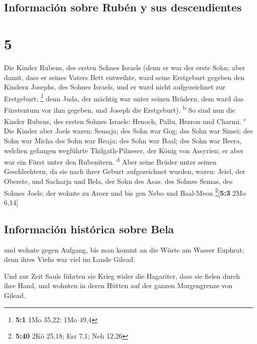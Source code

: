 \hypertarget{informaciuxf3n-sobre-rubuxe9n-y-sus-descendientes}{%
\subsection{Información sobre Rubén y sus
descendientes}\label{informaciuxf3n-sobre-rubuxe9n-y-sus-descendientes}}

\hypertarget{section-4}{%
\section{5}\label{section-4}}

 Die Kinder Rubens, des ersten Sohnes Israels (denn er war
der erste Sohn; aber damit, dass er seines Vaters Bett entweihte, ward
seine Erstgeburt gegeben den Kindern Josephs, des Sohnes Israels, und er
ward nicht aufgezeichnet zur Erstgeburt; \footnote{\textbf{5:1} 1Mo
  35,22; 1Mo 49,4}  denn Juda, der mächtig war unter
seinen Brüdern, dem ward das Fürstentum vor ihm gegeben, und Joseph die
Erstgeburt). \textsuperscript{b}  So sind nun die Kinder
Rubens, des ersten Sohnes Israels: Henoch, Pallu, Hezron und Charmi.
\textsuperscript{c}  Die Kinder aber Joels waren: Semaja;
des Sohn war Gog; des Sohn war Simei;  des Sohn war Micha
des Sohn war Reaja; des Sohn war Baal;  des Sohn war
Beera, welchen gefangen wegführte Thilgath-Pilneser, der König von
Assyrien; er aber war ein Fürst unter den Rubenitern.
\textsuperscript{d}  Aber seine Brüder unter seinen
Geschlechtern, da sie nach ihrer Geburt aufgezeichnet wurden, waren:
Jeiel, der Oberste, und Sacharja  und Bela, der Sohn des
Asas, des Sohnes Semas, des Sohnes Joels; der wohnte zu Aroer und bis
gen Nebo und Baal-Meon \footnote{\textbf{5:40} 2Kö 25,18; Esr 7,1; Neh
  12,26}{[}\textbf{5:3} 2Mo 6,14{]}

\hypertarget{informaciuxf3n-histuxf3rica-sobre-bela}{%
\subsection{Información histórica sobre
Bela}\label{informaciuxf3n-histuxf3rica-sobre-bela}}

 und wohnte gegen Aufgang, bis man kommt an die Wüste am
Wasser Euphrat; denn ihres Viehs war viel im Lande Gilead.

 Und zur Zeit Sauls führten sie Krieg wider die
Hagariter, dass sie fielen durch ihre Hand, und wohnten in deren Hütten
auf der ganzen Morgengrenze von Gilead.

